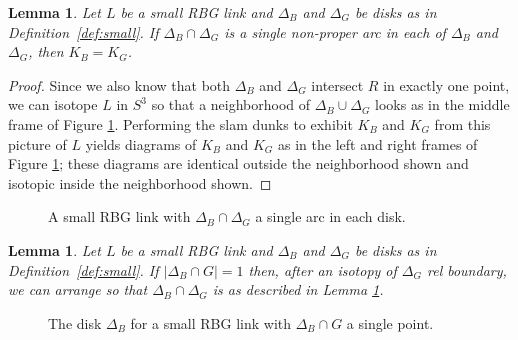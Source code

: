 \documentclass [11pt]{amsart}
\newtheorem {lemma}[theorem]{Lemma}
\theoremstyle{remark}
\begin{document}
\begin{lemma}\label{lem:delta1}
Let $L$ be a small RBG link and $\Delta_B$ and $\Delta_G$ be disks as in Definition~\ref{def:small}. If $\Delta_B\cap\Delta_G$ is a single non-proper arc in each of $\Delta_B$ and $\Delta_G$, then $K_B=K_G$.
\end{lemma}
\begin{proof}
Since we also know that both $\Delta_B$ and $\Delta_G$ intersect $R$ in exactly one point, we can isotope $L$ in $S^3$ so that a neighborhood of $\Delta_B\cup\Delta_G$ looks as in the middle frame of Figure \ref{fig:smallRBG1int}. Performing the slam dunks to exhibit $K_B$ and $K_G$ from this picture of $L$ yields diagrams of $K_B$ and $K_G$ as in the left and right frames of Figure \ref{fig:smallRBG1int}; these diagrams are identical outside the neighborhood shown and isotopic inside the neighborhood shown. 
\end{proof}
\begin{figure}
{
   \fontsize{9pt}{11pt}\selectfont
   \def\svgwidth{4in}
   
}
\caption{A small RBG link with $\Delta_B\cap\Delta_G$ a single arc in each disk.}
\label{fig:smallRBG1int}
\end{figure}


\begin{lemma}\label{lem:delta1boring}
Let $L$ be a small RBG link and $\Delta_B$ and $\Delta_G$ be disks as in Definition~\ref{def:small}. If $|\Delta_B \cap G|=1$ then, after an isotopy of $\Delta_G$ rel boundary, we can arrange so that $\Delta_B\cap \Delta_G$ is as described in Lemma \ref{lem:delta1}. 
\end{lemma}

\begin{figure}
{
   \fontsize{9pt}{11pt}\selectfont
   \def\svgwidth{2in}
   
}
\caption{The disk $\Delta_B$ for a small RBG link with $\Delta_B\cap G$ a single point.}
\label{fig:deltaB}
\end{figure}
\end{document}
